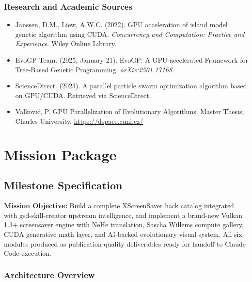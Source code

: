 \documentclass[11pt,letterpaper]{article}
\newcommand{\stageheader}[2]{%
  \noindent\colorbox{#2}{\makebox[\textwidth][l]{%
    \textcolor{white}{\bfseries\sffamily\hspace{6pt}#1\hspace{6pt}}}}%
  \vspace{0.5em}\par%
}
\begin{document}
\subsubsection{Research and Academic Sources}

\begin{itemize}
\item Janssen, D.M., Liew, A.W.C. (2022). GPU acceleration of island model genetic algorithm using CUDA. \textit{Concurrency and Computation: Practice and Experience}. Wiley Online Library.
\item EvoGP Team. (2025, January 21). EvoGP: A GPU-accelerated Framework for Tree-Based Genetic Programming. \textit{arXiv:2501.17168}.
\item ScienceDirect. (2023). A parallel particle swarm optimization algorithm based on GPU/CUDA. Retrieved via ScienceDirect.
\item Valkovič, P. GPU Parallelization of Evolutionary Algorithms. Master Thesis, Charles University. \url{https://dspace.cuni.cz/}
\end{itemize}

\newpage
\stageheader{STAGE 3 --- MISSION PACKAGE}{tertiary}

\section{Mission Package}

\subsection{Milestone Specification}

\textbf{Mission Objective:} Build a complete XScreenSaver hack catalog integrated with gsd-skill-creator upstream intelligence, and implement a brand-new Vulkan 1.3+ screensaver engine with NeHe translation, Sascha Willems compute gallery, CUDA generative math layer, and AI-backed evolutionary visual system. All six modules produced as publication-quality deliverables ready for handoff to Claude Code execution.

\subsubsection{Architecture Overview}
\end{document}
